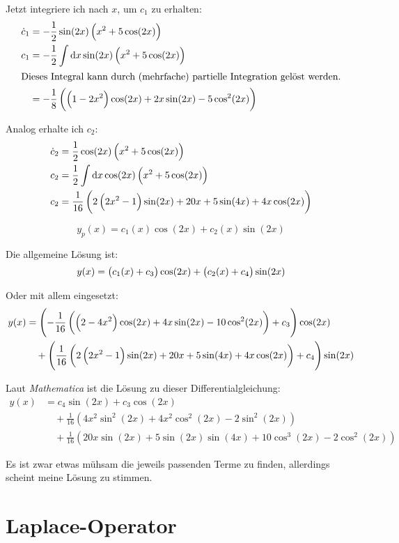 \documentclass[11pt, ngerman]{article}
\begin{document}
Jetzt integriere ich nach $x$, um $c_1$ zu erhalten:
\begin{align*}
	\dot c_1 &= -\frac 12 \sin(2x) \del{x^2 + 5 \cos(2x)} \\
	c_1 &= -\frac 12 \int \dif x \sin(2x) \del{x^2 + 5 \cos(2x)} \\
	\intertext{Dieses Integral kann durch (mehrfache) partielle Integration gelöst werden.}
		&= -\frac{1}{8} \left(\left(1-2 x^2\right) \cos (2 x)+2 x
   \sin (2 x)-5 \cos ^2(2 x)\right)
\end{align*}

Analog erhalte ich $c_2$:
\begin{align*}
	\dot c_2 &= \frac 12 \cos(2x) \del{x^2 + 5 \cos(2x)} \\
	c_2 &= \frac 12 \int \dif x \cos(2x) \del{x^2 + 5 \cos(2x)} \\
	c_2 &= \frac{1}{16} \left(2 \left(2 x^2-1\right) \sin (2 x)+20
   x+5 \sin (4 x)+4 x \cos (2 x)\right)
\end{align*}

\[
	y_p(x) = c_1(x) \cos(2x) + c_2(x) \sin(2x)
\]

Die allgemeine Lösung ist:
\[
	y(x) = \del{c_1(x) + c_3} \cos(2x) + \del{c_2(x) + c_4} \sin(2x)
\]

Oder mit allem eingesetzt:
\begin{align*}
	y(x) &=
	\del{-\frac{1}{16} \left(\left(2-4 x^2\right) \cos (2 x)+4 x
   \sin (2 x)-10 \cos ^2(2 x)\right) + c_3} \cos(2x) \\
	&\quad + \del{\frac{1}{16} \left(2 \left(2 x^2-1\right) \sin (2 x)+20
   x+5 \sin (4 x)+4 x \cos (2 x)\right) + c_4} \sin(2x)
\end{align*}

Laut \textit{Mathematica} ist die Lösung zu dieser
Differentialgleichung:
\begin{align*}
y(x) &= c_4 \sin (2 x)+c_3 \cos (2 x) \\
		 &\quad+\frac{1}{16} \left(4 x^2 \sin ^2(2 x)+4 x^2
   \cos ^2(2 x)-2 \sin ^2(2 x)\right) \\
   &\quad+\frac{1}{16} \left( 20 x \sin (2 x)+5 \sin (2 x) \sin (4 x)+10
   \cos ^3(2 x)-2 \cos ^2(2 x)\right)
\end{align*}

Es ist zwar etwas mühsam die jeweils passenden Terme zu finden, allerdings
scheint meine Lösung zu stimmen.

\section{Laplace-Operator}
\end{document}
